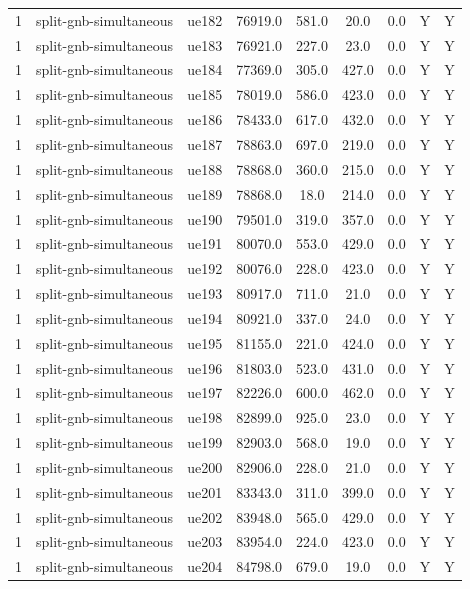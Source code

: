 \begin{table}[ht]
\begin{tabular}{|c|c|c|c|c|c|c|c|c|}
1 & split-gnb-simultaneous & ue182 & 76919.0 & 581.0 & 20.0 & 0.0 & Y & Y \\
1 & split-gnb-simultaneous & ue183 & 76921.0 & 227.0 & 23.0 & 0.0 & Y & Y \\
1 & split-gnb-simultaneous & ue184 & 77369.0 & 305.0 & 427.0 & 0.0 & Y & Y \\
1 & split-gnb-simultaneous & ue185 & 78019.0 & 586.0 & 423.0 & 0.0 & Y & Y \\
1 & split-gnb-simultaneous & ue186 & 78433.0 & 617.0 & 432.0 & 0.0 & Y & Y \\
1 & split-gnb-simultaneous & ue187 & 78863.0 & 697.0 & 219.0 & 0.0 & Y & Y \\
1 & split-gnb-simultaneous & ue188 & 78868.0 & 360.0 & 215.0 & 0.0 & Y & Y \\
1 & split-gnb-simultaneous & ue189 & 78868.0 & 18.0 & 214.0 & 0.0 & Y & Y \\
1 & split-gnb-simultaneous & ue190 & 79501.0 & 319.0 & 357.0 & 0.0 & Y & Y \\
1 & split-gnb-simultaneous & ue191 & 80070.0 & 553.0 & 429.0 & 0.0 & Y & Y \\
1 & split-gnb-simultaneous & ue192 & 80076.0 & 228.0 & 423.0 & 0.0 & Y & Y \\
1 & split-gnb-simultaneous & ue193 & 80917.0 & 711.0 & 21.0 & 0.0 & Y & Y \\
1 & split-gnb-simultaneous & ue194 & 80921.0 & 337.0 & 24.0 & 0.0 & Y & Y \\
1 & split-gnb-simultaneous & ue195 & 81155.0 & 221.0 & 424.0 & 0.0 & Y & Y \\
1 & split-gnb-simultaneous & ue196 & 81803.0 & 523.0 & 431.0 & 0.0 & Y & Y \\
1 & split-gnb-simultaneous & ue197 & 82226.0 & 600.0 & 462.0 & 0.0 & Y & Y \\
1 & split-gnb-simultaneous & ue198 & 82899.0 & 925.0 & 23.0 & 0.0 & Y & Y \\
1 & split-gnb-simultaneous & ue199 & 82903.0 & 568.0 & 19.0 & 0.0 & Y & Y \\
1 & split-gnb-simultaneous & ue200 & 82906.0 & 228.0 & 21.0 & 0.0 & Y & Y \\
1 & split-gnb-simultaneous & ue201 & 83343.0 & 311.0 & 399.0 & 0.0 & Y & Y \\
1 & split-gnb-simultaneous & ue202 & 83948.0 & 565.0 & 429.0 & 0.0 & Y & Y \\
1 & split-gnb-simultaneous & ue203 & 83954.0 & 224.0 & 423.0 & 0.0 & Y & Y \\
1 & split-gnb-simultaneous & ue204 & 84798.0 & 679.0 & 19.0 & 0.0 & Y & Y \\

\end{tabular}
\end{table}
